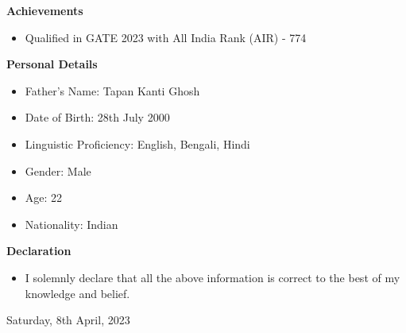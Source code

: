 \documentclass[a4paper,10pt]{article}
\newcommand{\resitem}[1]{\item #1}
\newcommand{\resheading}[1]{\vspace{0.5em} {\small \colorbox{mygrey}{{\begin{minipage}{0.975\textwidth}{{\textbf{#1}}}\end{minipage}}}} \vspace{0.5em}}
\begin{document}
\resheading{Achievements}
\begin{itemize}[noitemsep]
    \resitem{Qualified in GATE 2023 with All India Rank (AIR) - 774}
\end{itemize}

\resheading{Personal Details}
\begin{itemize}[noitemsep]
    \resitem{Father’s Name: Tapan Kanti Ghosh}
    \resitem{Date of Birth: 28th July 2000}
    \resitem{Linguistic Proficiency: English, Bengali, Hindi}
    \resitem{Gender: Male}
    \resitem{Age: 22}
    \resitem{Nationality: Indian}
\end{itemize}

\resheading{Declaration}
\begin{itemize}[noitemsep]
    \resitem{I solemnly declare that all the above information is correct to the best of my knowledge and belief.}
\end{itemize}
Saturday, 8th April, 2023
\end{document}

